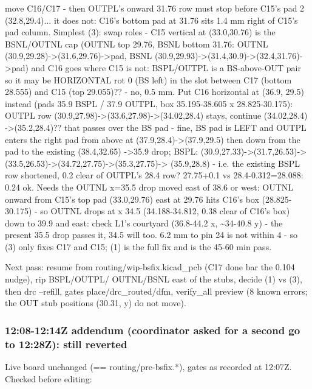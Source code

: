 \documentclass[11pt]{article}
\begin{document}
\begin{itemize}
move C16/C17 - then OUTPL's onward 31.76 row must stop before C15's pad 2 (32.8,29.4)... it
does not: C16's bottom pad at 31.76 sits 1.4 mm right of C15's pad column. Simplest (3): swap
roles - C15 vertical at (33.0,30.76) is the BSNL/OUTNL cap (OUTNL top 29.76, BSNL bottom 31.76:
OUTNL (30.9,29.28)-\textgreater{}(31.6,29.76)-\textgreater{}pad, BSNL (30.9,29.93)-\textgreater{}(31.4,30.9)-\textgreater{}(32.4,31.76)-\textgreater{}pad) and
C16 goes where C15 is not: BSPL/OUTPL is a BS-above-OUT pair so it may be HORIZONTAL rot 0 (BS
left) in the slot between C17 (bottom 28.555) and C15 (top 29.055)?? - no, 0.5 mm. Put C16
horizontal at (36.9, 29.5) instead (pads 35.9 BSPL / 37.9 OUTPL, box 35.195-38.605 x
28.825-30.175): OUTPL row (30.9,27.98)-\textgreater{}(33.6,27.98)-\textgreater{}(34.02,28.4) stays, continue (34.02,28.4)
-\textgreater{}(35.2,28.4)?? that passes over the BS pad - fine, BS pad is LEFT and OUTPL enters the right
pad from above at (37.9,28.4)-\textgreater{}(37.9,29.5) then down from the pad to the existing (38.4,32.65)
-\textgreater{}35.9 drop; BSPL: (30.9,27.33)-\textgreater{}(31.7,26.53)-\textgreater{}(33.5,26.53)-\textgreater{}(34.72,27.75)-\textgreater{}(35.3,27.75)-\textgreater{}
(35.9,28.8) - i.e. the existing BSPL row shortened, 0.2 clear of OUTPL's 28.4 row? 27.75+0.1 vs
28.4-0.312=28.088: 0.24 ok. Needs the OUTNL x=35.5 drop moved east of 38.6 or west: OUTNL onward
from C15's top pad (33.0,29.76) east at 29.76 hits C16's box (28.825-30.175) - so OUTNL drops at
x 34.5 (34.188-34.812, 0.38 clear of C16's box) down to 39.9 and east: check L1's courtyard
(36.8-44.2 x, \textasciitilde{}34-40.8 y) - the present 35.5 drop passes it, 34.5 will too. 6.2 mm to pin 24
is not within 4 - so (3) only fixes C17 and C15; (1) is the full fix and is the 45-60 min pass.
\end{itemize}
Next pass: resume from routing/wip-bsfix.kicad\_pcb (C17 done bar the 0.104 nudge), rip BSPL/OUTPL/ OUTNL/BSNL east of the stubs, decide (1) vs (3), then drc --refill, gates place/drc\_routed/dfm, verify\_all preview (8 known errors; the OUT stub positions (30.31, y) do not move).

\subsubsection*{12:08-12:14Z addendum (coordinator asked for a second go to 12:28Z): still reverted}
Live board unchanged (== routing/pre-bsfix.{*}), gates as recorded at 12:07Z. Checked before editing:
\end{document}
